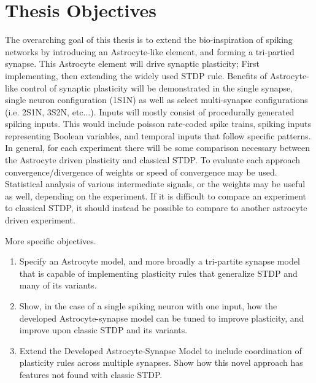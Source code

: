 \section{Thesis Objectives}

The overarching goal of this thesis is to extend the bio-inspiration of
spiking networks by introducing an Astrocyte-like element, and forming a
tri-partied synapse. This Astrocyte element will drive synaptic plasticity;
First implementing, then extending the widely used STDP rule. Benefits of
Astrocyte-like control of synaptic plasticity will be demonstrated in the
single synapse, single neuron configuration (1S1N) as well as select
multi-synapse configurations (i.e. 2S1N, 3S2N, etc...). Inputs will mostly
consist of procedurally generated spiking inputs. This would include poisson
rate-coded spike trains, spiking inputs representing Boolean variables, and
temporal inputs that follow specific patterns. In general, for each
experiment there will be some comparison necessary between the Astrocyte
driven plasticity and classical STDP. To evaluate each approach
convergence/divergence of weights or speed of convergence may be
used. Statistical analysis of various intermediate signals, or the weights
may be useful as well, depending on the experiment. If it is difficult to
compare an experiment to classical STDP, it should instead be possible to
compare to another astrocyte driven experiment.

More specific objectives.
\begin{enumerate}
  \item Specify an Astrocyte model, and more broadly a tri-partite synapse
    model that is capable of implementing plasticity rules that generalize
    STDP and many of its variants.

  \item Show, in the case of a single spiking neuron with one input, how
    the developed Astrocyte-synapse model can be tuned to improve
    plasticity, and improve upon classic STDP and its variants.

  \item Extend the Developed Astrocyte-Synapse Model to include coordination of
    plasticity rules across multiple synapses. Show how this novel approach has
    features not found with classic STDP.

\end{enumerate}
